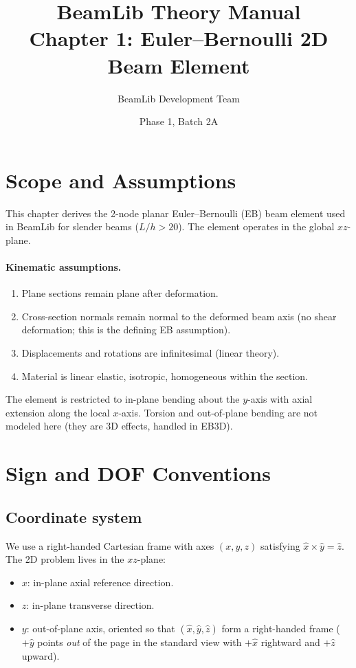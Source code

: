 \documentclass[11pt,a4paper]{article}
\title{BeamLib Theory Manual \\ Chapter 1: Euler--Bernoulli 2D Beam Element}
\author{BeamLib Development Team}
\date{Phase 1, Batch 2A}
\begin{document}
\maketitle

\section{Scope and Assumptions}

This chapter derives the 2-node planar Euler--Bernoulli (EB) beam element used in BeamLib for slender beams ($L/h > 20$). The element operates in the global $xz$-plane.

\paragraph{Kinematic assumptions.}
\begin{enumerate}
    \item Plane sections remain plane after deformation.
    \item Cross-section normals remain normal to the deformed beam axis (no shear deformation; this is the defining EB assumption).
    \item Displacements and rotations are infinitesimal (linear theory).
    \item Material is linear elastic, isotropic, homogeneous within the section.
\end{enumerate}

The element is restricted to in-plane bending about the $y$-axis with axial extension along the local $x$-axis. Torsion and out-of-plane bending are not modeled here (they are 3D effects, handled in EB3D).

\section{Sign and DOF Conventions}

\subsection{Coordinate system}

We use a right-handed Cartesian frame with axes $(x, y, z)$ satisfying $\hat{x} \times \hat{y} = \hat{z}$. The 2D problem lives in the $xz$-plane:
\begin{itemize}
    \item $x$: in-plane axial reference direction.
    \item $z$: in-plane transverse direction.
    \item $y$: out-of-plane axis, oriented so that $(\hat{x}, \hat{y}, \hat{z})$ form a right-handed frame ($+\hat{y}$ points \emph{out} of the page in the standard view with $+\hat{x}$ rightward and $+\hat{z}$ upward).
\end{itemize}
\end{document}
